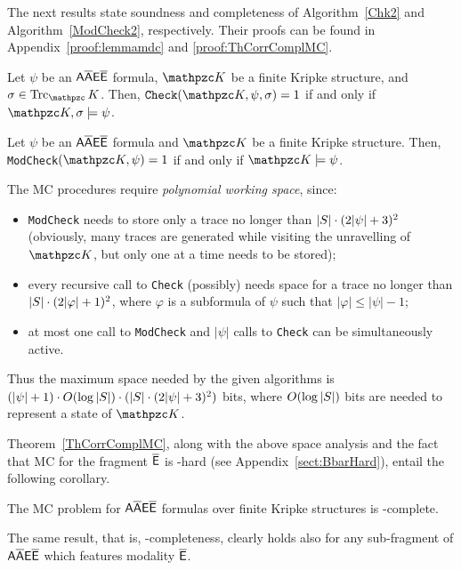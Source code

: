 The next results state soundness and completeness of  Algorithm~\ref{Chk2} and Algorithm~\ref{ModCheck2}, respectively. Their proofs can be found in Appendix~\ref{proof:lemmamdc} and \ref{proof:ThCorrComplMC}.

\begin{lemma}\label{lemmamdc}
Let $\psi$ be an $\mathsf{A\overline{A}E\overline{E}}$ formula, $\Ku$ be a finite Kripke structure, and $\sigma\in\Trk_\Ku$. Then, $\texttt{Check}(\Ku, \psi,\sigma)=1$ if and only if $\Ku,\sigma\models \psi$.
\end{lemma}

\begin{theorem}\label{ThCorrComplMC}
Let $\psi$ be an $\mathsf{A\overline{A}E\overline{E}}$ formula and $\Ku$ be a finite Kripke structure. Then, \texttt{ModCheck}$(\Ku,\psi)=1$ if and only if $\Ku\models \psi$.
\end{theorem}


The MC procedures require \emph{polynomial working space}, since:
\begin{itemize}
        \item \texttt{ModCheck} needs to store only a trace no longer than $|S|\cdot (2|\psi|+3)^2$ (obviously, many traces are generated while visiting the unravelling of $\Ku$, but only one at a time needs to be stored);
        \item every recursive call to \texttt{Check} (possibly) needs space for a trace no longer than $|S|\cdot
        (2|\varphi|+1)^2$, where $\varphi$ is a subformula of $\psi$ such that $|\varphi|\leq |\psi|-1$;
        \item at most one call to \texttt{ModCheck} and $|\psi|$ calls to \texttt{Check} can be simultaneously active.
\end{itemize}
Thus the maximum space needed by the given algorithms is $(|\psi|+1)\cdot O(\log |S|)\cdot (|S|\cdot (2|\psi|+3)^2)$ bits, where $O(\log |S|)$ bits are needed to represent a state of $\Ku$. 

Theorem~\ref{ThCorrComplMC}, along with the above space analysis and the fact that
MC for the fragment $\mathsf{\overline{E}}$ is \PSPACE-hard (see Appendix~\ref{sect:BbarHard}), entail the following corollary.
%
\begin{corollary}
The MC problem for $\mathsf{A\overline{A}E\overline{E}}$ formulas over finite Kripke structures is \PSPACE-complete.
\end{corollary}
%
The same result, that is, \PSPACE-completeness, clearly holds also for any sub-fragment of $\mathsf{A\overline{A}E\overline{E}}$ which features modality $\mathsf{\overline{E}}$. %


